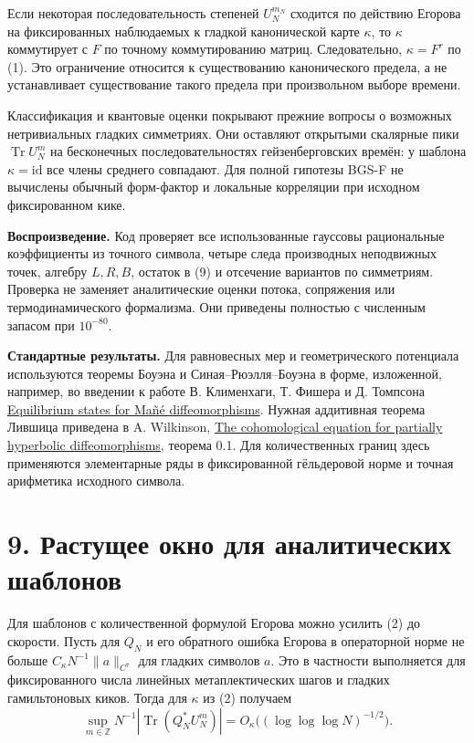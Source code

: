 \documentclass[11pt,a4paper]{article}
\newcommand{\Tr}{\operatorname{Tr}}
\newcommand{\Z}{\mathbb Z}
\newcommand{\sect}[1]{\section*{\sffamily\color{ink}#1}}
\newcommand{\subt}[1]{\par\medskip\noindent\textbf{#1.}\quad}
\begin{document}
Если некоторая последовательность степеней $U_N^{m_N}$ сходится по действию Егорова на фиксированных наблюдаемых к гладкой канонической карте $\kappa$, то $\kappa$ коммутирует с $F$ по точному коммутированию матриц. Следовательно, $\kappa=F^r$ по (1). Это ограничение относится к существованию канонического предела, а не устанавливает существование такого предела при произвольном выборе времени.

Классификация и квантовые оценки покрывают прежние вопросы о возможных нетривиальных гладких симметриях. Они оставляют открытыми скалярные пики $\Tr U_N^m$ на бесконечных последовательностях гейзенберговских времён: у шаблона $\kappa=\mathrm{id}$ все члены среднего совпадают. Для полной гипотезы BGS-F не вычислены обычный форм-фактор и локальные корреляции при исходном фиксированном кике.

\subt{Воспроизведение} Код проверяет все использованные гауссовы рациональные коэффициенты из точного символа, четыре следа производных неподвижных точек, алгебру $L,R,B$, остаток в (9) и отсечение вариантов по симметриям. Проверка не заменяет аналитические оценки потока, сопряжения или термодинамического формализма. Они приведены полностью с численным запасом при $10^{-80}$.

\subt{Стандартные результаты} Для равновесных мер и геометрического потенциала используются теоремы Боуэна и Синая--Рюэлля--Боуэна в форме, изложенной, например, во введении к работе В. Клименхаги, Т. Фишера и Д. Томпсона \href{https://www.math.uh.edu/~climenha/doc/CFT-Mane.pdf}{Equilibrium states for Mañé diffeomorphisms}. Нужная аддитивная теорема Лившица приведена в A. Wilkinson, \href{https://www.math.uchicago.edu/~wilkinso/papers/livsic.pdf}{The cohomological equation for partially hyperbolic diffeomorphisms}, теорема 0.1. Для количественных границ здесь применяются элементарные ряды в фиксированной гёльдеровой норме и точная арифметика исходного символа.
\newpage
\sect{9. Растущее окно для аналитических шаблонов}
Для шаблонов с количественной формулой Егорова можно усилить (2) до скорости. Пусть для $Q_N$ и его обратного ошибка Егорова в операторной норме не больше $C_\kappa N^{-1}\|a\|_{C^7}$ для гладких символов $a$. Это в частности выполняется для фиксированного числа линейных метаплектических шагов и гладких гамильтоновых киков. Тогда для $\kappa$ из (2) получаем
\[
       \sup_{m\in\Z} N^{-1}|\Tr(Q_N^* U_N^m)|
                  =O_\kappa\bigl((\log\log\log N)^{-1/2}\bigr).     \tag{11}
\]
\end{document}
